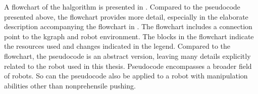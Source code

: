 A flowchart of the \ac{halgorithm} is presented in . Compared to the pseudocode presented above, the flowchart provides more detail, especially in the elaborate description accompanying the flowchart in . The flowchart includes a connection point to the \ac{kgraph} and robot environment. The blocks in the flowchart indicate the resources used and changes indicated in the legend. Compared to the flowchart, the pseudocode is an abstract version, leaving many details explicitly related to the robot used in this thesis. Pseudocode encompasses a broader field of robots. So can the pseudocode also be applied to a robot with manipulation abilities other than nonprehensile pushing.\bs



